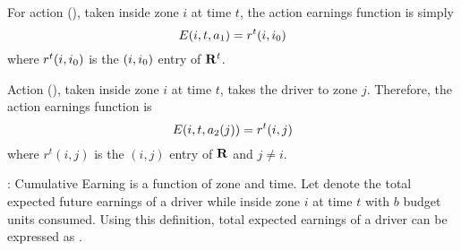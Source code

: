 	\item For action {\gohomeaction} ({\gohome}), taken inside zone $i$ at time $t$, the action earnings function is simply
	\begin{equation}\label{eq:a1}
	E({i},{t},{a_1}) = r^t(i,{i_0})
	\end{equation}
	where $r^t(i,{i_0})$ is the $(i,{i_0})$ entry of ${\mathbf{R}}^t$. 

	\item Action {\relocateaction} ({\relocate}), taken inside zone $i$ at time $t$, 
	takes the driver to zone $j$. Therefore, the action earnings function is
	\begin{equation}\label{eq:a2}
	E({i},{t},{a_2(j)}) = r^t(i,j)
	\end{equation}
	where $r^t(i,j)$ is the $(i,j)$ entry of ${\mathbf{R}}$ and $j \neq i$. \\
\squishend

\iffalse
{}:
Cumulative Earning is a function of zone and time. Let {} denote the total expected future earnings of a driver
while inside zone $i$ at time $t$ with $b$ budget units consumed. Using this definition, total expected earnings of a driver can be expressed
as {}.

